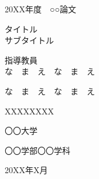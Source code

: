 \begin{titlepage}
  \begin{center}
    
    {\Large 20XX年度　○○論文}
    
    \vspace*{100truept}
    
    {\Huge タイトル \\
    \vspace{8truept}
    \LARGE サブタイトル}
    
    \vspace{120truept}
    
    {\large 指導教員 \\
    \vspace{8truept}
    \Large な　ま　え　な　ま　え}
    
    \vspace{80truept}
    
    {\LARGE な　ま　え　な　ま　え}
    
    \vspace{20truept}
    
    {\Large XXXXXXXX}
    
    \vspace{10truept}
    
    {\large 〇〇大学}
    
    \vspace{10truept}
    
    {\large 〇〇学部〇〇学科}
    
    \vspace{20truept}
    
    {\large 20XX年X月}
    
  \end{center}
\end{titlepage}